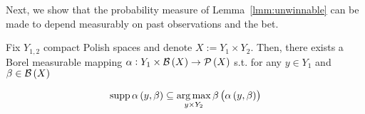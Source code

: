Next, we show that the probability measure of Lemma~\ref{lmm:unwinnable} can be made to depend measurably on past observations and the bet.

\begin{lemma}
\label{lmm:measurable_unwinnable}

Fix $Y_{1,2}$ compact Polish spaces and denote $X:=Y_1 \times Y_2$. Then, there exists a Borel measurable mapping $\alpha: Y_1 \times \mathcal{B}\left(X\right) \rightarrow \mathcal{P}\left(X\right)$ s.t. for any $y \in Y_1$ and $\beta \in \mathcal{B}\left(X\right)$

\begin{equation}
\operatorname{supp} \alpha\left(y,\beta\right) \subseteq \underset{y \times Y_2}{\operatorname{arg\,max}}\, \beta\left(\alpha\left(y,\beta\right)\right)
\end{equation}

\end{lemma}

